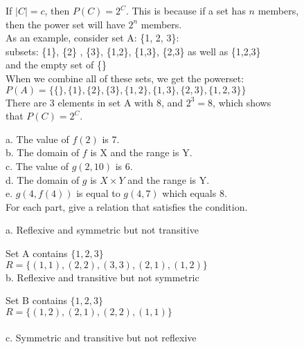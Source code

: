 \documentclass[12pt]{article}
\begin{document}
\indent
If $|C| = c$, then $P(C) = 2^{C}$. This is because if a set has $n$ members, \\
\indent then the power set will have $2^{n}$ members. \\

As an example, consider set A: \{1, 2, 3\}: \\

subsets: \{1\}, \{2\} , \{3\}, \{1,2\}, \{1,3\}, \{2,3\} as well as \{1,2,3\} \\
\indent and the empty set of \{\} \\

When we combine all of these sets, we get the powerset: \\
\indent $P(A) = \{\{\},  \{1\}, \{2\}, \{3\}, \{1,2\}, \{1,3\}, \{2,3\}, \{1,2,3\}  \}$ \\

There are 3 elements in set A with 8, and $2^{3} = 8$, which shows \\
\indent that $P(C) = 2^{C}$. \\


a. The value of $f(2)$ is 7. \\

b. The domain of $f$ is X and the range is Y. \\

c. The value of $g(2,10)$ is 6. \\

d. The domain of $g$ is $X \times Y$ and the range is Y. \\

e. $g(4, f(4))$ is equal to $g(4, 7)$ which equals 8. \\

 \quad For each part, give a relation that satisfies the condition.

a. Reflexive and symmetric but not transitive

\quad Set A contains $\{1, 2, 3\}$ \\
\indent \quad $R = \{(1,1), (2,2), (3,3), (2,1), (1, 2) \}$ \\

b. Reflexive and transitive but not symmetric

\quad Set B contains $\{1, 2, 3\}$ \\
\indent \quad $R = \{(1,2), (2,1), (2,2), (1,1)\} $ \\ \\

c. Symmetric and transitive but not reflexive
\end{document}
